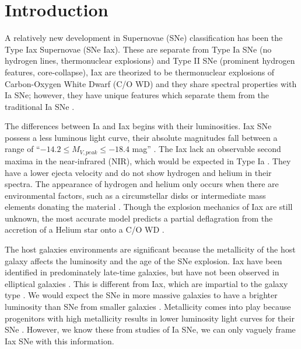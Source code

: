 \documentclass[preprint]{aastex}
\begin{document}
\section{Introduction}
A relatively new development in Supernovae (SNe) classification 
has been the Type Iax Supernovae (SNe Iax). 
These are separate from Type Ia SNe (no hydrogen lines, thermonuclear explosions) 
and Type II SNe (prominent hydrogen features, core-collapse), 
Iax are theorized to be thermonuclear explosions of Carbon-Oxygen
White Dwarf (C/O WD) and they share spectral properties with Ia SNe; however,
they have unique features which separate them from the traditional Ia SNe \citep{fol1304}. 

The differences between Ia and Iax begins with their luminosities.
Iax SNe possess a less luminous light curve, 
their absolute magnitudes fall between a range of 
``$-14.2 \leq M_{V,peak} \leq -18.4$ mag''
 \citep{fol1304}.
The Iax lack an observable second maxima in the near-infrared (NIR),
which would be expected in Type Ia \citep{li03}. 
They have a lower ejecta velocity and do not show hydrogen and helium in their
 spectra.
The appearance of hydrogen and helium only occurs when there are environmental factors, such as  
a circumstellar disks or intermediate mass elements donating the material \citep{fol09}. 
Though the explosion mechanics of Iax are still unknown, the most accurate model
predicts a partial deflagration from the accretion of a Helium star 
onto a C/O WD \citep{krom13, fol1304}.

The host galaxies environments are significant because
the metallicity of the host galaxy affects the luminosity and the age of the
SNe explosion.
Iax have been identified in predominately late-time galaxies, 
but have not been observed in elliptical galaxies \citep{fol1304}. 
This is different from Iax, which are impartial to the galaxy type \citep{van92}. 
We would expect the SNe in more massive galaxies to have a brighter 
luminosity than SNe from smaller galaxies  \citep{fol1305}. 
Metallicity comes into play because progenitors with high 
metallicity results in lower luminosity light curves for their SNe \citep{tim03}. 
However, we know these from studies of Ia SNe, we can only vaguely frame Iax SNe with this information. 
 
\end{document}
